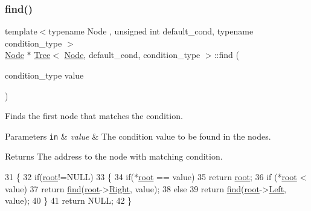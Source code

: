 \subsubsection{\texorpdfstring{find()}{find()}\hspace{0.1cm}{\footnotesize\ttfamily [1/2]}}
{\footnotesize\ttfamily template$<$typename Node , unsigned int default\+\_\+cond, typename condition\+\_\+type $>$ \\
\hyperlink{struct_node}{Node} $\ast$ \hyperlink{class_tree}{Tree}$<$ \hyperlink{struct_node}{Node}, default\+\_\+cond, condition\+\_\+type $>$\+::find (\begin{DoxyParamCaption}\item[{condition\+\_\+type}]{value }\end{DoxyParamCaption})}

Finds the first node that matches the condition. 
\begin{DoxyParams}[1]{Parameters}
\mbox{\tt in}  & {\em value} & The condition value to be found in the nodes. \\
\hline
\end{DoxyParams}
\begin{DoxyReturn}{Returns}
The address to the node with matching condition. 
\end{DoxyReturn}

\begin{DoxyCode}
31 \{
32     \textcolor{keywordflow}{if}(\hyperlink{class_tree_ae1cb548295b2e451164d89b16ac72d17}{root}!=NULL)
33     \{
34         \textcolor{keywordflow}{if}(*\hyperlink{class_tree_ae1cb548295b2e451164d89b16ac72d17}{root} == value)
35             \textcolor{keywordflow}{return} \hyperlink{class_tree_ae1cb548295b2e451164d89b16ac72d17}{root};
36         \textcolor{keywordflow}{if} (*\hyperlink{class_tree_ae1cb548295b2e451164d89b16ac72d17}{root} < value)
37             \textcolor{keywordflow}{return} \hyperlink{class_tree_a7ad01e2d8b572e6d1f97e0031214117a}{find}(\hyperlink{class_tree_ae1cb548295b2e451164d89b16ac72d17}{root}->\hyperlink{struct_node_ae5ad7032e0a9a52f5a849e33e23a7dfa}{Right}, value);
38         \textcolor{keywordflow}{else}
39             \textcolor{keywordflow}{return} \hyperlink{class_tree_a7ad01e2d8b572e6d1f97e0031214117a}{find}(\hyperlink{class_tree_ae1cb548295b2e451164d89b16ac72d17}{root}->\hyperlink{struct_node_a779292dace788d33114830cca763ccf3}{Left}, value);
40     \}
41     \textcolor{keywordflow}{return} NULL;
42 \}
\end{DoxyCode}
\mbox{\label{class_tree_ac539645ded3041f4142b8cb0a8a1c0b8}} 
